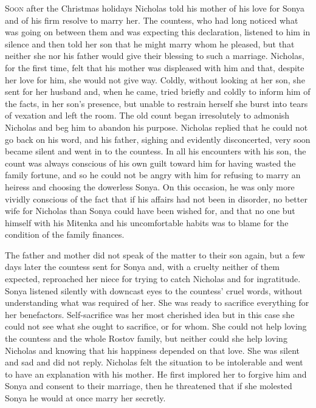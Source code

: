 \lettrine[lines=2, loversize=0.3, lraise=0]{\initfamily S}{oon}
after the Christmas holidays Nicholas told his mother of his
love for Sonya and of his firm resolve to marry her. The
countess, who had long noticed what was going on between them and
was expecting this declaration, listened to him in silence and
then told her son that he might marry whom he pleased, but that
neither she nor his father would give their blessing to such a
marriage. Nicholas, for the first time, felt that his mother was
displeased with him and that, despite her love for him, she would
not give way. Coldly, without looking at her son, she sent for
her husband and, when he came, tried briefly and coldly to inform
him of the facts, in her son's presence, but unable to restrain
herself she burst into tears of vexation and left the room. The
old count began irresolutely to admonish Nicholas and beg him to
abandon his purpose. Nicholas replied that he could not go back
on his word, and his father, sighing and evidently disconcerted,
very soon became silent and went in to the countess. In all his
encounters with his son, the count was always conscious of his
own guilt toward him for having wasted the family fortune, and so
he could not be angry with him for refusing to marry an heiress
and choosing the dowerless Sonya. On this occasion, he was only
more vividly conscious of the fact that if his affairs had not
been in disorder, no better wife for Nicholas than Sonya could
have been wished for, and that no one but himself with his
Mitenka and his uncomfortable habits was to blame for the
condition of the family finances.

The father and mother did not speak of the matter to their son
again, but a few days later the countess sent for Sonya and, with
a cruelty neither of them expected, reproached her niece for
trying to catch Nicholas and for ingratitude. Sonya listened
silently with downcast eyes to the countess' cruel words, without
understanding what was required of her. She was ready to
sacrifice everything for her benefactors. Self-sacrifice was her
most cherished idea but in this case she could not see what she
ought to sacrifice, or for whom. She could not help loving the
countess and the whole Rostov family, but neither could she help
loving Nicholas and knowing that his happiness depended on that
love. She was silent and sad and did not reply. Nicholas felt the
situation to be intolerable and went to have an explanation with
his mother. He first implored her to forgive him and Sonya and
consent to their marriage, then he threatened that if she
molested Sonya he would at once marry her secretly.

